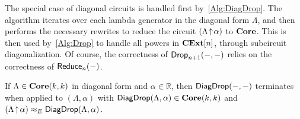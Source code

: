 The special case of diagonal circuits is handled first by~\cref{Alg:DiagDrop}.
The algorithm iterates over each lambda generator in the diagonal form $\Lambda$, and then performs the necessary rewrites to reduce the circuit $( \Lambda \!\uparrow\! \alpha )$ to $\mathbf{Core}$.
This is then used by~\cref{Alg:Drop} to handle all powers in $\mathbf{CExt}[n]$, through subcircuit diagonalization.
Of course, the correctness of $\mathsf{Drop}_{n+1}( -, - )$ relies on the correctness of $\mathsf{Reduce}_n( - )$.

\begin{lemma}
    \label{Lem:DiagDrop}
    If $\Lambda \in \mathbf{Core}( k, k )$ in diagonal form and $\alpha \in \mathbb{R}$, then $\mathsf{DiagDrop}( -, - )$ terminates when applied to $( \Lambda, \alpha )$ with $\mathsf{DiagDrop}( \Lambda, \alpha ) \in \mathbf{Core}( k, k )$ and $( \Lambda \!\uparrow\! \alpha ) \approx_E \mathsf{DiagDrop}( \Lambda, \alpha )$.
\end{lemma}

